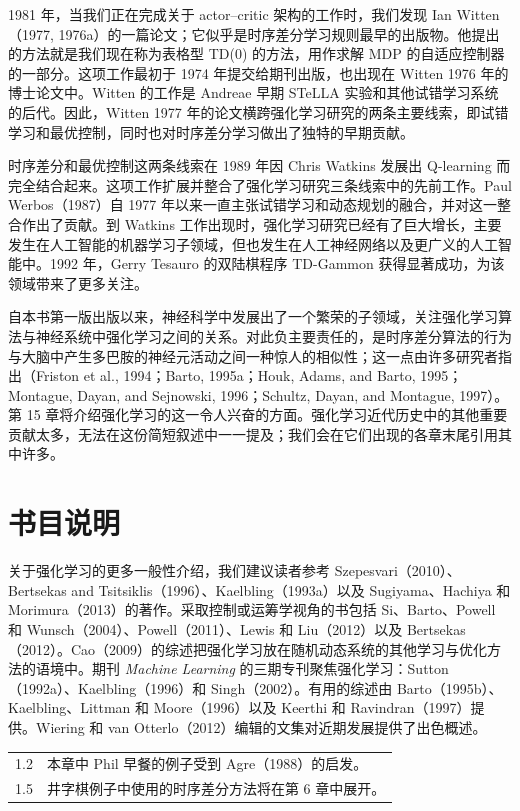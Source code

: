 \documentclass[UTF8, 12pt, fontset=fandol, oneside]{ctexart}
\begin{document}
1981 年，当我们正在完成关于 actor--critic 架构的工作时，我们发现 Ian Witten（1977, 1976a）的一篇论文；它似乎是时序差分学习规则最早的出版物。他提出的方法就是我们现在称为表格型 TD(0) 的方法，用作求解 MDP 的自适应控制器的一部分。这项工作最初于 1974 年提交给期刊出版，也出现在 Witten 1976 年的博士论文中。Witten 的工作是 Andreae 早期 STeLLA 实验和其他试错学习系统的后代。因此，Witten 1977 年的论文横跨强化学习研究的两条主要线索，即试错学习和最优控制，同时也对时序差分学习做出了独特的早期贡献。

时序差分和最优控制这两条线索在 1989 年因 Chris Watkins 发展出 Q-learning 而完全结合起来。这项工作扩展并整合了强化学习研究三条线索中的先前工作。Paul Werbos（1987）自 1977 年以来一直主张试错学习和动态规划的融合，并对这一整合作出了贡献。到 Watkins 工作出现时，强化学习研究已经有了巨大增长，主要发生在人工智能的机器学习子领域，但也发生在人工神经网络以及更广义的人工智能中。1992 年，Gerry Tesauro 的双陆棋程序 TD-Gammon 获得显著成功，为该领域带来了更多关注。

自本书第一版出版以来，神经科学中发展出了一个繁荣的子领域，关注强化学习算法与神经系统中强化学习之间的关系。对此负主要责任的，是时序差分算法的行为与大脑中产生多巴胺的神经元活动之间一种惊人的相似性；这一点由许多研究者指出（Friston et al., 1994；Barto, 1995a；Houk, Adams, and Barto, 1995；Montague, Dayan, and Sejnowski, 1996；Schultz, Dayan, and Montague, 1997）。第 15 章将介绍强化学习的这一令人兴奋的方面。强化学习近代历史中的其他重要贡献太多，无法在这份简短叙述中一一提及；我们会在它们出现的各章末尾引用其中许多。

\section*{书目说明}

关于强化学习的更多一般性介绍，我们建议读者参考 Szepesvari（2010）、Bertsekas and Tsitsiklis（1996）、Kaelbling（1993a）以及 Sugiyama、Hachiya 和 Morimura（2013）的著作。采取控制或运筹学视角的书包括 Si、Barto、Powell 和 Wunsch（2004）、Powell（2011）、Lewis 和 Liu（2012）以及 Bertsekas（2012）。Cao（2009）的综述把强化学习放在随机动态系统的其他学习与优化方法的语境中。期刊 \textit{Machine Learning} 的三期专刊聚焦强化学习：Sutton（1992a）、Kaelbling（1996）和 Singh（2002）。有用的综述由 Barto（1995b）、Kaelbling、Littman 和 Moore（1996）以及 Keerthi 和 Ravindran（1997）提供。Wiering 和 van Otterlo（2012）编辑的文集对近期发展提供了出色概述。

\begin{longtable}{p{}p{}}
1.2 & 本章中 Phil 早餐的例子受到 Agre（1988）的启发。 \\
1.5 & 井字棋例子中使用的时序差分方法将在第 6 章中展开。 \\
\end{longtable}
\end{document}
